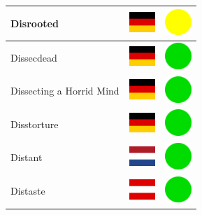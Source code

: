 \documentclass[12pt, a4paper, twoside]{report}
\begin{document}
\begin{center}
\begin{longtable}{|p{5cm}|p{2cm}|p{2cm}|}
 Disrooted                                                  & \includegraphics[width=1cm]{../img/flags/de} &   \includegraphics[width=1cm]{../likes/m} \\ \hline
 Dissecdead                                                 & \includegraphics[width=1cm]{../img/flags/de} &   \includegraphics[width=1cm]{../likes/y} \\ \hline
 Dissecting a Horrid Mind                                   & \includegraphics[width=1cm]{../img/flags/de} &   \includegraphics[width=1cm]{../likes/y} \\ \hline
 Disstorture                                                & \includegraphics[width=1cm]{../img/flags/de} &   \includegraphics[width=1cm]{../likes/y} \\ \hline
 Distant                                                    & \includegraphics[width=1cm]{../img/flags/nl} &   \includegraphics[width=1cm]{../likes/y} \\ \hline
 Distaste                                                   & \includegraphics[width=1cm]{../img/flags/at} &   \includegraphics[width=1cm]{../likes/y} \\ \hline

\end{longtable}
\end{center}
\end{document}
